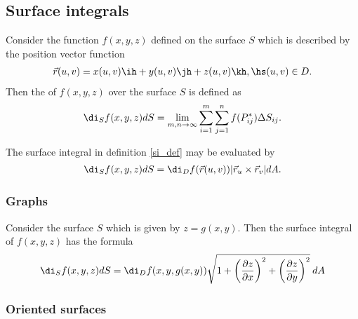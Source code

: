 \documentclass{article}
\begin{document}
\subsection{Surface integrals}


\begin{definition}
    \label{si_def}
    Consider the function $f(x,y,z)$ defined on the surface $S$ which is described by the
    position vector function
    \begin{align*}
        \vec r(u,v) = x(u,v)\ih + y(u,v)\jh + z(u,v)\kh,\hs (u,v)\in D.
    \end{align*}
    Then the  of $f(x,y,z)$ over the surface $S$ is defined as
    \begin{align*}
        \di_S f(x,y,z)dS = \lim_{m,n\to\infty}\sum_{i=1}^m\sum_{j=1}^n f(P_{ij}^*)\Delta S_{ij}.
    \end{align*}
\end{definition}
\begin{theorem}
    The surface integral in definition \ref{si_def} may be evaluated by
    \begin{align*}
        \di_S f(x,y,z)dS = \di_D f(\vec r(u,v)) |\vec r_u\times \vec r_v|dA.
    \end{align*}
\end{theorem}

\subsubsection{Graphs}

\begin{theorem}
    Consider the surface $S$ which is given by $z=g(x,y)$. Then the surface integral 
    of $f(x,y,z)$ has the formula
    \begin{align*}
        \di_S f(x,y,z)dS = \di_D f(x,y,g(x,y))\sqrt{1+\left(\frac{\partial z}{\partial x}\right)^2+\left(\frac{\partial z}{\partial y}\right)^2}\:dA
    \end{align*}
\end{theorem}

\subsubsection{Oriented surfaces}
\end{document}
